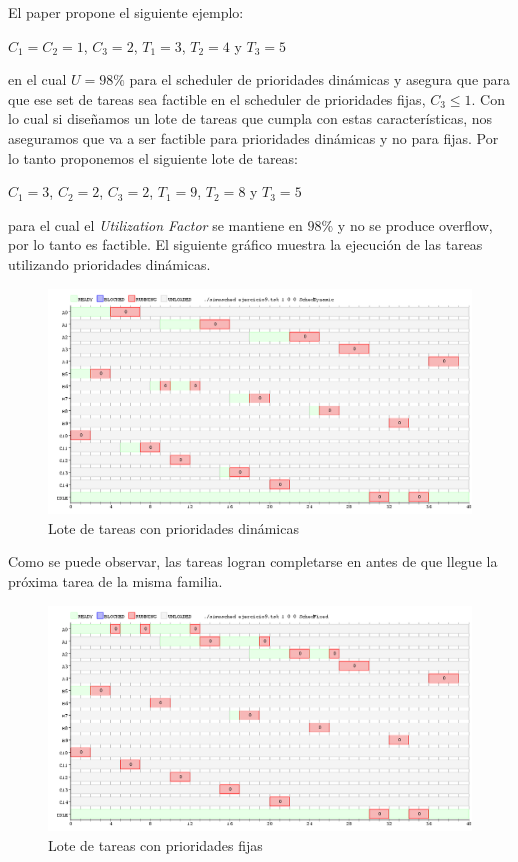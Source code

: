 \documentclass[a4paper,11pt]{article}
\begin{document}
El paper propone el siguiente ejemplo:
\begin{center}
$C_1 = C_2 = 1$, $C_3 = 2$, $T_1 = 3$, $T_2 = 4$ y $T_3 = 5$
\end{center}
en el cual $U = 98\% $ para el scheduler de prioridades dinámicas y asegura que para que ese set de tareas sea factible en el scheduler de prioridades fijas, $C_3 \leq 1$. Con lo cual si diseñamos un lote de tareas que cumpla con estas características, nos aseguramos que va a ser factible para prioridades dinámicas y no para fijas. Por lo tanto proponemos el siguiente lote de tareas:
\begin{center}
$C_1 = 3$, $ C_2 = 2$, $C_3 = 2$, $T_1 = 9$, $T_2 = 8$ y $T_3 = 5$
\end{center}
para el cual el \emph{Utilization Factor} se mantiene en $98\%$ y no se produce overflow, por lo tanto es factible. El siguiente gráfico muestra la ejecución de las tareas utilizando prioridades dinámicas.
\begin{figure}[H]
\centering
\includegraphics[scale=.6, width=1\textwidth]{graficos/ej9-dyn}
\caption{Lote de tareas con prioridades dinámicas}
\end{figure}
Como se puede observar, las tareas logran completarse en antes de que llegue la próxima tarea de la misma familia.
\begin{figure}[H]
\centering
\includegraphics[scale=.6, width=1\textwidth]{graficos/ej9-fix}
\caption{Lote de tareas con prioridades fijas}
\end{figure}
\end{document}
